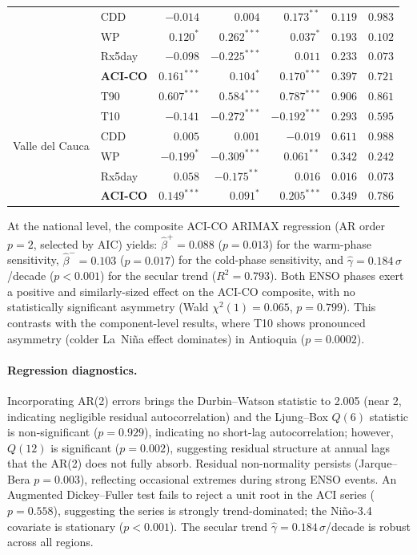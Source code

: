 \documentclass[12pt]{article}
\begin{document}
\begin{table}[H]
\begin{tabular}{@{}llrrrr r@{}}
   & CDD & $-0.014$ & $0.004$ & $0.173^{**}$ & $0.119$ & $0.983$ \\
   & WP & $0.120^{*}$ & $0.262^{***}$ & $0.037^{*}$ & $0.193$ & $0.102$ \\
   & Rx5day & $-0.098$ & $-0.225^{***}$ & $0.011$ & $0.233$ & $0.073$ \\
   & \textbf{ACI-CO} & $0.161^{***}$ & $0.104^{*}$ & $0.170^{***}$ & $0.397$ & $0.721$ \\
  \midrule
  \multirow{6}{*}{Valle del Cauca} & T90 & $0.607^{***}$ & $0.584^{***}$ & $0.787^{***}$ & $0.906$ & $0.861$ \\
   & T10 & $-0.141$ & $-0.272^{***}$ & $-0.192^{***}$ & $0.293$ & $0.595$ \\
   & CDD & $0.005$ & $0.001$ & $-0.019$ & $0.611$ & $0.988$ \\
   & WP & $-0.199^{*}$ & $-0.309^{***}$ & $0.061^{**}$ & $0.342$ & $0.242$ \\
   & Rx5day & $0.058$ & $-0.175^{**}$ & $0.016$ & $0.016$ & $0.073$ \\
   & \textbf{ACI-CO} & $0.149^{***}$ & $0.091^{*}$ & $0.205^{***}$ & $0.349$ & $0.786$ \\
\bottomrule
\end{tabular}
\end{table}


At the national level, the composite ACI-CO ARIMAX regression (AR order $p=2$, selected by AIC) yields: $\hat{\beta}^+ = 0.088$ ($p = 0.013$) for the warm-phase sensitivity, $\hat{\beta}^- = 0.103$ ($p = 0.017$) for the cold-phase sensitivity, and $\hat{\gamma} = 0.184$\,$\sigma$/decade ($p < 0.001$) for the secular trend ($R^2 = 0.793$). Both ENSO phases exert a positive and similarly-sized effect on the ACI-CO composite, with no statistically significant asymmetry (Wald $\chi^2(1) = 0.065$, $p = 0.799$). This contrasts with the component-level results, where T10 shows pronounced asymmetry (colder La~Ni\~na effect dominates) in Antioquia ($p = 0.0002$).

\paragraph{Regression diagnostics.} Incorporating AR(2) errors brings the Durbin--Watson statistic to 2.005 (near 2, indicating negligible residual autocorrelation) and the Ljung--Box $Q(6)$ statistic is non-significant ($p = 0.929$), indicating no short-lag autocorrelation; however, $Q(12)$ is significant ($p = 0.002$), suggesting residual structure at annual lags that the AR(2) does not fully absorb. Residual non-normality persists (Jarque--Bera $p = 0.003$), reflecting occasional extremes during strong ENSO events. An Augmented Dickey--Fuller test fails to reject a unit root in the ACI series ($p = 0.558$), suggesting the series is strongly trend-dominated; the Ni\~no-3.4 covariate is stationary ($p < 0.001$). The secular trend $\hat{\gamma} = 0.184$\,$\sigma$/decade is robust across all regions.
\end{document}
